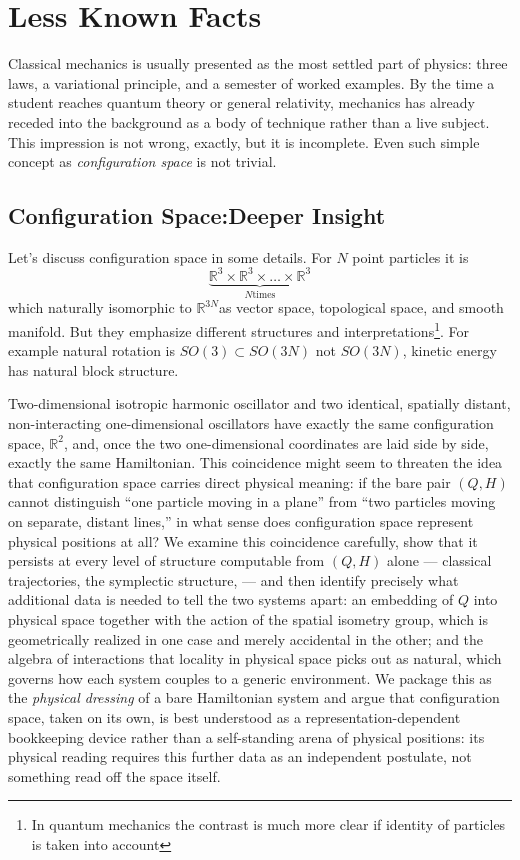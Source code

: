 \chapter{Less Known Facts}
\label{lnf}

Classical mechanics is usually presented as the most settled part of
physics: three laws, a variational principle, and a semester of
worked examples. By the time a student reaches quantum theory or
general relativity, mechanics has already receded into the
background as a body of technique rather than a live subject. This
impression is not wrong, exactly, but it is incomplete. 
Even such simple concept as \emph{configuration space} is not trivial.

\section{Configuration Space:Deeper Insight}
\label{lnf:cs}

Let's discuss configuration space in some details. For $N$ point particles it
is 
\[\underbrace{\mathbb{R}^3 \times \mathbb{R}^3 \times \dots
\times\mathbb{R}^3}_{N \text{times}}\] 
which naturally isomorphic to
$\mathbb{R}^{3 N}$as vector space, topological space, and smooth manifold. But
they emphasize different structures and interpretations\footnote{In quantum 
mechanics the contrast is much more clear if identity of particles is taken 
into account}. For example natural
rotation is $SO(3) \subset SO(3N)$ not $SO(3N)$, kinetic energy has natural block
structure. 

Two-dimensional isotropic harmonic oscillator and two
identical, spatially distant, non-interacting one-dimensional oscillators have
exactly the same configuration space, $\mathbb{R}^2$, and, once the two
one-dimensional coordinates are laid side by side, exactly the same
Hamiltonian. This coincidence might seem to threaten the idea that
configuration space carries direct physical meaning: if the bare pair $(Q,H)$
cannot distinguish ``one particle moving in a plane'' from ``two particles
moving on separate, distant lines,'' in what sense does configuration space
represent physical positions at all? We examine this coincidence carefully,
show that it persists at every level of structure computable from $(Q,H)$ alone
--- classical trajectories, the symplectic structure,
--- and then identify precisely what additional data is needed
to tell the two systems apart:  an embedding of $Q$ into physical space
together with the action of the spatial isometry group, which is geometrically
realized in one case and merely accidental in the other;
and  the algebra of interactions that locality in physical
space picks out as natural, which governs how each system couples to a generic
environment. We package this as the \emph{physical dressing} of a bare
Hamiltonian system and argue that configuration space, taken on its own, is
best understood as a representation-dependent bookkeeping device rather than a
self-standing arena of physical positions: its physical reading requires this
further data as an independent postulate, not something read off the space
itself.

